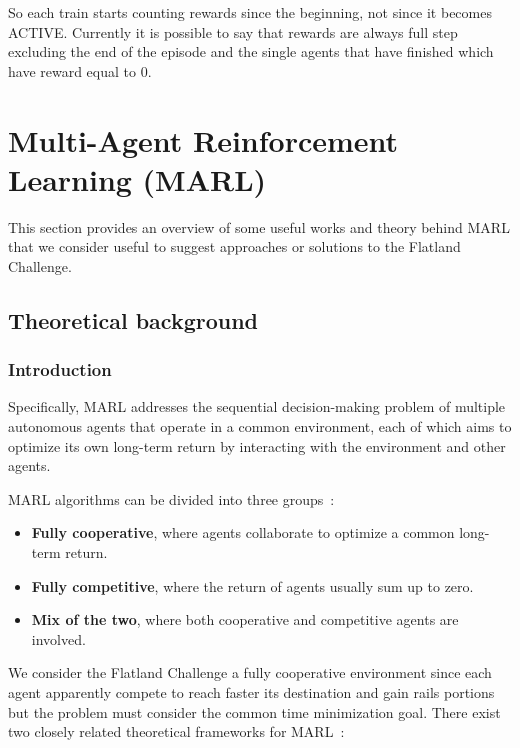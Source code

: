 \documentclass[11pt, a4paper, hidelinks]{report}
\begin{document}
So each train starts counting rewards since the beginning, not since it becomes ACTIVE\@.
Currently it is possible to say that rewards are always full step excluding the end of the episode and the single agents that have finished which have reward equal to 0.

\chapter{Multi-Agent Reinforcement Learning (MARL)}\label{ch:multi-agent-reinforcement-learning}

This section provides an overview of some useful works and theory behind MARL that we consider useful to suggest approaches or solutions to the Flatland Challenge.

\section{Theoretical background}\label{sec:marl-theoretical-background}

\subsection{Introduction}\label{subsec:introduction}

\begin{quoting}[font=itshape, begintext={"}, endtext={"\citep{MARL_definition}}]
Specifically, MARL addresses the sequential decision-making problem of multiple autonomous agents that operate in a common environment, each of which aims to optimize its own long-term return by interacting with the environment and other agents.
\end{quoting}

MARL algorithms can be divided into three groups~\citep{zhang2019multiagent}:

\begin{itemize}
	\item \textbf{Fully cooperative}, where agents collaborate to optimize a common long-term return.
	\item \textbf{Fully competitive}, where the return of agents usually sum up to zero.
	\item \textbf{Mix of the two}, where both cooperative and competitive agents are involved.
\end{itemize}

We consider the Flatland Challenge a fully cooperative environment since each agent apparently compete to reach faster its destination and gain rails portions but the problem must consider the common time minimization goal.
There exist two closely related theoretical frameworks for MARL~\citep{zhang2019multiagent}:
\end{document}

